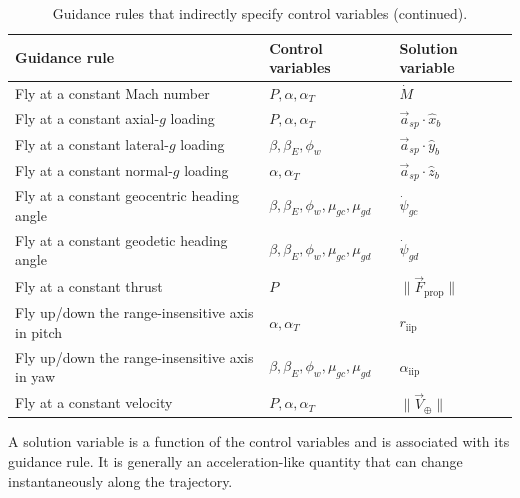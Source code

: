 \begin{table}[htbp]
  \ContinuedFloat
  \centering
  \caption[]{Guidance rules that indirectly specify control variables (continued).}
  \small
  \renewcommand{\arraystretch}{1.08}
  \begin{tabularx}{\linewidth}{@{}>{\raggedright\arraybackslash}X>{\raggedright\arraybackslash}p{}>{\centering\arraybackslash}p{}@{}}
    \toprule
    Guidance rule & Control variables & Solution variable\\
    \midrule
    Fly at a constant Mach number & $P,\alpha,\alpha_T$ & $\dot M$\\
    Fly at a constant axial-$g$ loading & $P,\alpha,\alpha_T$ & $\vec a_{sp}\cdot\hat x_b$\\
    Fly at a constant lateral-$g$ loading & $\beta,\beta_E,\phi_w$ & $\vec a_{sp}\cdot\hat y_b$\\
    Fly at a constant normal-$g$ loading & $\alpha,\alpha_T$ & $\vec a_{sp}\cdot\hat z_b$\\
    Fly at a constant geocentric heading angle & $\beta,\beta_E,\phi_w,\mu_{gc},\mu_{gd}$ & $\dot\psi_{gc}$\\
    Fly at a constant geodetic heading angle & $\beta,\beta_E,\phi_w,\mu_{gc},\mu_{gd}$ & $\dot\psi_{gd}$\\
    Fly at a constant thrust & $P$ & $\lVert\vec F_{\mathrm{prop}}\rVert$\\
    Fly up/down the range-insensitive axis in pitch & $\alpha,\alpha_T$ & $r_{\mathrm{iip}}$\\
    Fly up/down the range-insensitive axis in yaw & $\beta,\beta_E,\phi_w,\mu_{gc},\mu_{gd}$ & $\alpha_{\mathrm{iip}}$\\
    Fly at a constant velocity & $P,\alpha,\alpha_T$ & $\lVert\vec V_{\oplus}\rVert$\\
    \bottomrule
  \end{tabularx}
\end{table}

A solution variable is a function of the control variables and is associated with its
guidance rule. It is generally an acceleration-like quantity that can change
instantaneously along the trajectory.
